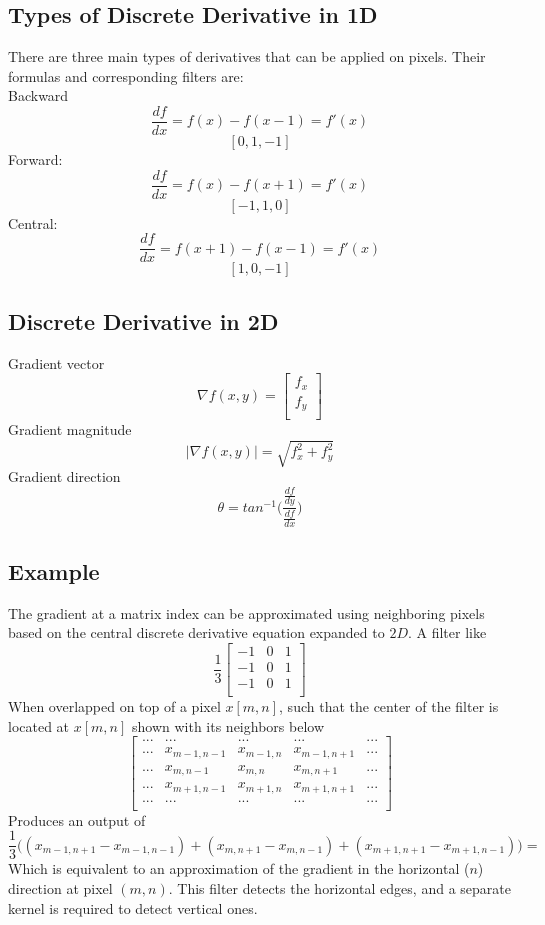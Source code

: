 \documentclass{article}
\begin{document}
\subsection{Types of Discrete Derivative in 1D}
There are three main types of derivatives that can be applied on pixels. Their formulas and corresponding filters are:\\
Backward
$$\frac{df}{dx} = f(x) - f(x-1) = f'(x)$$
$$[0, 1, -1]$$
Forward:
$$\frac{df}{dx} = f(x) - f(x+1) = f'(x)$$
$$[-1, 1, 0]$$
Central:
$$\frac{df}{dx} = f(x+1) - f(x-1) = f'(x)$$
$$[1, 0, -1]$$
\subsection{Discrete Derivative in 2D}
Gradient vector
$$ \nabla f(x,y) = \begin{bmatrix} f_x\\
f_y\\
\end{bmatrix}  $$
Gradient magnitude
$$ |\nabla f(x,y)| = \sqrt{f_x^2 + f_y^2}$$
Gradient direction
$$ \theta = tan^{-1}\Big( \frac{\frac{df}{dy}}{\frac{df}{dx}}\Big)$$

\subsection{Example}
The gradient at a matrix index can be approximated using neighboring pixels based on the central discrete derivative equation expanded to $2D$. A filter like
$$ \frac{1}{3}\begin{bmatrix} -1 & 0 & 1\\
-1 & 0 & 1 \\
-1 & 0 & 1 \\\end{bmatrix}$$
When overlapped on top of a pixel $x[m,n]$, such that the center of the filter is located at $x[m,n]$ shown with its neighbors below
$$ \begin{bmatrix}
...&...&...&...&...\\
...&x_{m-1,n-1} & x_{m-1,n} & x_{m-1,n+1}&... \\
...&x_{m,n-1} & x_{m,n} & x_{m,n+1}&...\\
...&x_{m+1,n-1} & x_{m+1,n} & x_{m+1,n+1}&...\\
...&...&...&...&...\\
\end{bmatrix}
$$
Produces an output of
$$\frac{1}{3}\Big((x_{m-1,n+1} - x_{m-1,n-1})+ (x_{m,n+1}-x_{m,n-1}) + (x_{m+1,n+1} - x_{m+1,n-1})\Big) = $$
Which is equivalent to an approximation of the gradient in the horizontal ($n$) direction at pixel $(m,n)$. This filter detects the horizontal edges, and a separate kernel is required to detect vertical ones.
\end{document}

